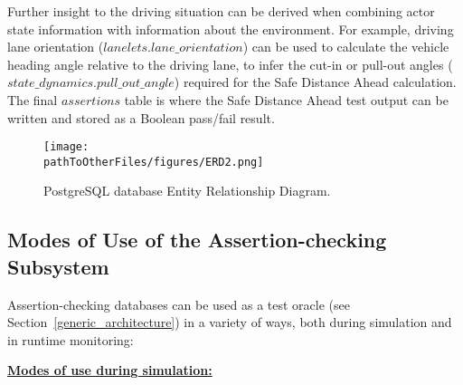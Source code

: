 Further insight to the driving situation can be derived when combining actor state information with information about the environment. For example, driving lane orientation ($lanelets.lane\_orientation$) can be used to calculate the vehicle heading angle relative to the driving lane, to infer the cut-in or pull-out angles ($state\_dynamics.pull\_out\_angle$) required for the Safe Distance Ahead calculation. The final $assertions$ table is where the Safe Distance Ahead test output can be written and stored as a Boolean pass/fail result.

\begin{figure}
    \centering
    \texttt{[image: \\pathToOtherFiles/figures/ERD2.png]}
    \caption{PostgreSQL database Entity Relationship Diagram.}
    \label{fig:erd}
\end{figure}


\subsection{Modes of Use of the Assertion-checking Subsystem} \label{Assertions_at_Sim_Time} \label{assertions_at_run_time}

Assertion-checking databases can be used as a test oracle (see Section~\ref{generic_architecture}) in a variety of ways, both during simulation and in runtime monitoring:


\underline{\textbf{Modes of use during simulation:}}

